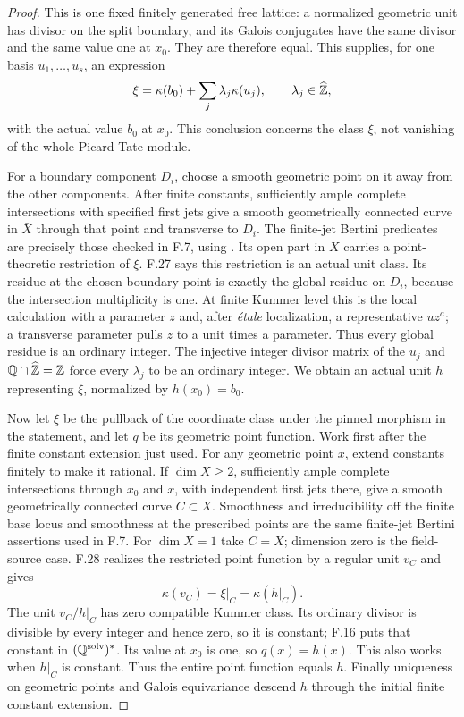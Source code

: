 \begin{proof}
This is one fixed finitely generated free lattice: a normalized
geometric unit has divisor on the split boundary, and its Galois
conjugates have the same divisor and the same value one at $x_0$.
They are therefore equal. This supplies, for one basis
$u_1,\ldots,u_s$, an expression
\[
 \xi=\kappa(b_0)+\sum_j\lambda_j\kappa(u_j),
       \qquad \lambda_j\in\widehat{\mathbb Z},
\]
with the actual value $b_0$ at $x_0$. This conclusion concerns
the class $\xi$, not vanishing of the whole Picard Tate module.

For a boundary component $D_i$, choose a smooth geometric point
on it away from the other components. After finite constants,
sufficiently ample complete intersections with specified first
jets give a smooth geometrically connected curve in $\bar X$
through that point and transverse to $D_i$. The finite-jet
Bertini predicates are precisely those checked in F.7, using
\citet[Lemmas~33.47.1, 33.47.3 and 37.32.3]{F_StacksBertini}.
Its open part in $X$ carries a point-theoretic restriction of
$\xi$. F.27 says this restriction is an actual unit class.
Its residue at the chosen boundary point is exactly the global
residue on $D_i$, because the intersection multiplicity is one.
At finite Kummer level this is the local calculation with a
parameter $z$ and, after \emph{\'etale} localization, a
representative $u z^a$; a transverse parameter pulls $z$ to a
unit times a parameter. Thus every global residue is an ordinary
integer. The injective integer divisor matrix of the $u_j$ and
$\mathbb Q\cap\widehat{\mathbb Z}=\mathbb Z$ force every $\lambda_j$ to be an
ordinary integer. We obtain an actual unit $h$ representing
$\xi$, normalized by $h(x_0)=b_0$.

Now let $\xi$ be the pullback of the coordinate class under the
pinned morphism in the statement, and let $q$ be its geometric
point function. Work first after the finite constant extension
just used. For any geometric point $x$, extend constants
finitely to make it rational. If $\dim X\ge2$, sufficiently
ample complete intersections through $x_0$ and $x$, with
independent first jets there, give a smooth geometrically
connected curve $C\subset X$. Smoothness and irreducibility
off the finite base locus and smoothness at the prescribed
points are the same finite-jet Bertini assertions used in F.7.
For $\dim X=1$ take $C=X$; dimension zero is the field-source
case. F.28 realizes the restricted point function by a regular
unit $v_C$ and gives
\[
 \kappa(v_C)=\xi|_C=\kappa(h|_C).
\]
The unit $v_C/h|_C$ has zero compatible Kummer class. Its
ordinary divisor is divisible by every integer and hence zero,
so it is constant; F.16 puts that constant in
$(\mathbb Q^{\mathrm{solv}})^*$. Its value at $x_0$ is one, so
$q(x)=h(x)$. This also works when $h|_C$ is constant.
Thus the entire point function equals $h$.
Finally uniqueness on geometric points and Galois equivariance
descend $h$ through the initial finite constant extension.
\end{proof}

